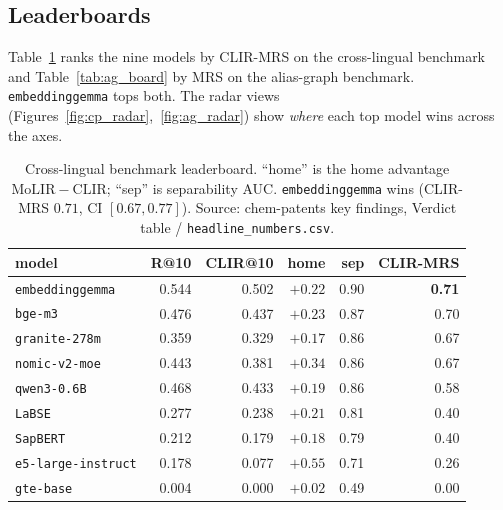 \documentclass[11pt]{article}
\begin{document}
\subsection{Leaderboards}
\label{ssec:boards}

Table~\ref{tab:cp_board} ranks the nine models by CLIR-MRS on the cross-lingual
benchmark and Table~\ref{tab:ag_board} by MRS on the alias-graph benchmark.
\texttt{embeddinggemma} tops both. The radar views
(Figures~\ref{fig:cp_radar},~\ref{fig:ag_radar}) show \emph{where} each top
model wins across the axes.

\begin{table}[t]
  \centering
  \small
  \begin{tabular}{lrrrrr}
    \toprule
    model & R@10 & CLIR@10 & home & sep & CLIR-MRS \\
    \midrule
    \texttt{embeddinggemma} & 0.544 & 0.502 & $+0.22$ & 0.90 & \textbf{0.71} \\
    \texttt{bge-m3}         & 0.476 & 0.437 & $+0.23$ & 0.87 & 0.70 \\
    \texttt{granite-278m}   & 0.359 & 0.329 & $+0.17$ & 0.86 & 0.67 \\
    \texttt{nomic-v2-moe}   & 0.443 & 0.381 & $+0.34$ & 0.86 & 0.67 \\
    \texttt{qwen3-0.6B}     & 0.468 & 0.433 & $+0.19$ & 0.86 & 0.58 \\
    \texttt{LaBSE}          & 0.277 & 0.238 & $+0.21$ & 0.81 & 0.40 \\
    \texttt{SapBERT}        & 0.212 & 0.179 & $+0.18$ & 0.79 & 0.40 \\
    \texttt{e5-large-instruct} & 0.178 & 0.077 & $+0.55$ & 0.71 & 0.26 \\
    \texttt{gte-base}       & 0.004 & 0.000 & $+0.02$ & 0.49 & 0.00 \\
    \bottomrule
  \end{tabular}
  \caption{Cross-lingual benchmark leaderboard. ``home'' is the home advantage
  $\mathrm{MoLIR}{-}\mathrm{CLIR}$; ``sep'' is separability AUC.
  \texttt{embeddinggemma} wins (CLIR-MRS $0.71$, CI $[0.67,0.77]$).
  Source: chem-patents key findings, Verdict table / \texttt{headline\_numbers.csv}.}
  \label{tab:cp_board}
\end{table}
\end{document}
